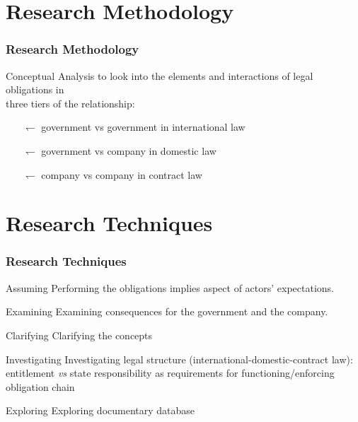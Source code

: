 \documentclass[pdflatex,compress,10pt,
	xcolor={dvipsnames,dvipsnames,svgnames,x11names,table},
	hyperref={
	colorlinks = true,
	breaklinks = true, 
	citecolor=NavyBlue, 
	urlcolor = blue, 
	filecolor=magenta} 
]{beamer}
\begin{document}
\section{Research Methodology}
\begin{frame}\frametitle{Research Methodology}

\begin{alertblock}{Conceptual Analysis}
 to look into the elements and interactions of legal obligations in\\
  \alert{three tiers} of the relationship:
 \begin{itemize}
	\item [$\leftharpoondown$] government vs government in international law
	\item [$\leftharpoondown$] government vs company in domestic law
	\item [$\leftharpoondown$] company vs company in contract law
\end{itemize}
\end{alertblock}

\end{frame}

\section{Research Techniques}
\begin{frame}\frametitle{Research Techniques}
\small{
\begin{alertblock}{Assuming}
Performing the obligations implies aspect of actors’ expectations.
\end{alertblock}

\begin{block}{Examining}
Examining consequences for the government and the company.
\end{block}

\begin{alertblock}{Clarifying}
Clarifying the concepts
\end{alertblock}

\begin{block}{Investigating}
Investigating legal structure (international-domestic-contract law): entitlement \emph{vs} state responsibility as requirements for functioning/enforcing obligation chain
\end{block}

\begin{alertblock}{Exploring}
Exploring documentary database 
\end{alertblock}
}
\end{frame}
\end{document}
